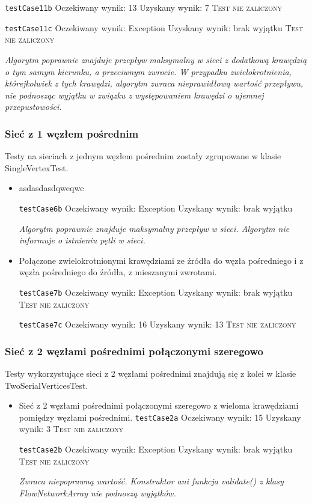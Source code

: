 \begin{itemize}[nosep]
    \texttt{testCase11b}
    Oczekiwany wynik: 13
    Uzyskany wynik: 7
    \textsc{Test nie zaliczony}

    \texttt{testCase11c}
    Oczekiwany wynik: Exception
    Uzyskany wynik: brak wyjątku
    \textsc{Test nie zaliczony}

    \emph{Algorytm poprawnie znajduje przepływ maksymalny w sieci z dodatkową
    krawędzią o tym samym kierunku, a przeciwnym zwrocie. W przypadku
    zwielokrotnienia, którejkolwiek z tych krawędzi, algorytm zwraca nieprawidłową
    wartość przepływu, nie podnosząc wyjątku w związku z występowaniem krawędzi
    o ujemnej przepustowości.}

\end{itemize}


\subsubsection{Sieć z 1 węzłem pośrednim}
Testy na sieciach z jednym węzłem pośrednim zostały zgrupowane
w klasie SingleVertexTest.
\begin{itemize}[nosep]

    \item asdasdasdqweqwe

    \texttt{testCase6b}
    Oczekiwany wynik: Exception
    Uzyskany wynik: brak wyjątku

    \emph{Algorytm poprawnie znajduje maksymalny przepływ w sieci. Algorytm
    nie informuje o istnieniu pętli w sieci.}

    \item Połączone zwielokrotnionymi krawędziami ze źródła do węzła pośredniego
    i z węzła pośredniego do źródła, z mieszanymi zwrotami.

    \texttt{testCase7b}
    Oczekiwany wynik: Exception
    Uzyskany wynik: brak wyjątku
    \textsc{Test nie zaliczony}

    \texttt{testCase7c}
    Oczekiwany wynik: 16
    Uzyskany wynik: 13
    \textsc{Test nie zaliczony}

\end{itemize}

\subsubsection{Sieć z 2 węzłami pośrednimi połączonymi szeregowo}
Testy wykorzystujące sieci z 2 węzłami pośrednimi znajdują się z kolei w klasie
TwoSerialVerticesTest.
\begin{itemize}[nosep]
    \item Sieć z 2 węzłami pośrednimi połączonymi szeregowo z wieloma
    krawędziami pomiędzy węzłami pośrednimi.
    \texttt{testCase2a}
    Oczekiwany wynik: 15
    Uzyskany wynik: 3
    \textsc{Test nie zaliczony}

    \texttt{testCase2b}
    Oczekiwany wynik: Exception
    Uzyskany wynik: brak wyjątku
    \textsc{Test nie zaliczony}

    \emph{Zwraca niepoprawną wartość. Konstruktor ani funkcja validate() z klasy
    FlowNetworkArray nie podnoszą wyjątków.}

\end{itemize}


